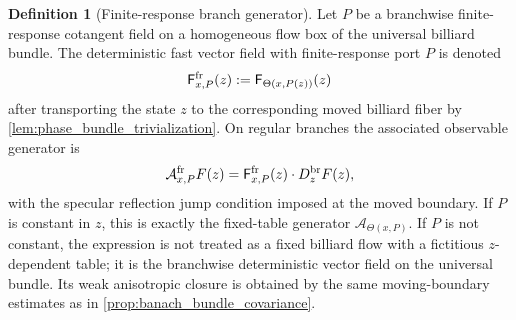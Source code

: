 \documentclass[12pt, letterpaper]{amsart}
\newcommand{\Acal}{\mathcal{A}}
\newcommand{\Ffast}{\mathsf F}
\theoremstyle{plain}
\theoremstyle{definition}
\newtheorem{definition}[theorem]{Definition}
\theoremstyle{remark}
\begin{document}
\begin{definition}[Finite-response branch generator]
\label{def:finite_response_branch_generator}
Let $P$ be a branchwise finite-response cotangent field on a homogeneous flow
box of the universal billiard bundle.  The deterministic fast vector field with
finite-response port $P$ is denoted
\begin{equation}
    \Ffast^{\rm fr}_{x,P}(z)
    :=\Ffast_{\Theta(x,P(z))}(z)
\end{equation}
after transporting the state $z$ to the corresponding moved billiard fiber by
\cref{lem:phase_bundle_trivialization}.  On regular branches the associated
observable generator is
\begin{equation}
    \Acal^{\rm fr}_{x,P}F(z)
    =\Ffast^{\rm fr}_{x,P}(z)\cdot D_z^{\rm br}F(z),
\end{equation}
with the specular reflection jump condition imposed at the moved boundary.  If
$P$ is constant in $z$, this is exactly the fixed-table generator
$\Acal_{\Theta(x,P)}$.  If $P$ is not constant, the expression is not treated as
a fixed billiard flow with a fictitious $z$-dependent table; it is the
branchwise deterministic vector field on the universal bundle.  Its weak
anisotropic closure is obtained by the same moving-boundary estimates as in
\cref{prop:banach_bundle_covariance}.
\end{definition}
\end{document}
